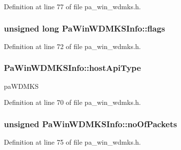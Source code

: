 Definition at line 77 of file pa\+\_\+win\+\_\+wdmks.\+h.

\subsubsection[{\texorpdfstring{flags}{flags}}]{\setlength{\rightskip}{0pt plus 5cm}unsigned long Pa\+Win\+W\+D\+M\+K\+S\+Info\+::flags}\hypertarget{struct_pa_win_w_d_m_k_s_info_a2c46387aee219e1499120b056d74e94d}{}\label{struct_pa_win_w_d_m_k_s_info_a2c46387aee219e1499120b056d74e94d}


Definition at line 72 of file pa\+\_\+win\+\_\+wdmks.\+h.

\subsubsection[{\texorpdfstring{host\+Api\+Type}{hostApiType}}]{ Pa\+Win\+W\+D\+M\+K\+S\+Info\+::host\+Api\+Type}\hypertarget{struct_pa_win_w_d_m_k_s_info_a28bff7039063cc48ebab4e13cd1bf3c7}{}\label{struct_pa_win_w_d_m_k_s_info_a28bff7039063cc48ebab4e13cd1bf3c7}
pa\+W\+D\+M\+KS 

Definition at line 70 of file pa\+\_\+win\+\_\+wdmks.\+h.

\subsubsection[{\texorpdfstring{no\+Of\+Packets}{noOfPackets}}]{\setlength{\rightskip}{0pt plus 5cm}unsigned Pa\+Win\+W\+D\+M\+K\+S\+Info\+::no\+Of\+Packets}\hypertarget{struct_pa_win_w_d_m_k_s_info_af1a2e073583ac238a60f1acbee470e28}{}\label{struct_pa_win_w_d_m_k_s_info_af1a2e073583ac238a60f1acbee470e28}


Definition at line 75 of file pa\+\_\+win\+\_\+wdmks.\+h.

